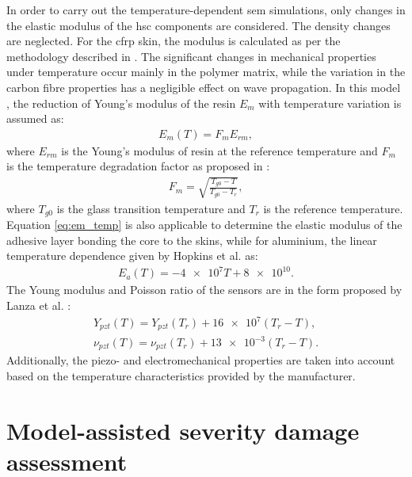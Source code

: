 \documentclass[11pt,a4paper,final]{report}
\begin{document}
In order to carry out the temperature-dependent \ac{sem} simulations, only changes in the elastic modulus of the \ac{hsc} components are considered.
The density changes are neglected. For the \ac{cfrp} skin, the modulus is calculated as per the methodology described in \cite{chamis1983simplified,salamone2009guided}.
The significant changes in mechanical properties under temperature occur mainly in the polymer matrix, while the variation in the carbon fibre properties has a negligible effect on wave propagation.
In this model \cite{salamone2009guided,hopkins2012extreme}, the reduction of Young’s modulus of the resin \(E_m\) with temperature variation is assumed as:
\begin{eqnarray}
	E_m(T)=F_m E_{rm},
	\label{eq:factor_temp}
\end{eqnarray}
where \(E_{rm}\) is the Young’s modulus of resin at the reference temperature and \(F_m\) is the temperature degradation factor as proposed in \cite{chamis1983simplified}:
\begin{eqnarray}
F_m=\sqrt{\frac{T_{g0}-T}{T_{g0}-T_r}},
\label{eq:em_temp}
\end{eqnarray}
where \(T_{g0}\) is the glass transition temperature and \(T_r\) is the reference temperature.
Equation \ref{eq:em_temp} is also applicable to determine the elastic modulus of the adhesive layer bonding the core to the skins, while for aluminium, the linear temperature dependence given by Hopkins et al. \cite{hopkins2012extreme} as:
\begin{eqnarray}
	E_a(T)=-\num{4e7}T+\num{8e10}.
	\label{eq:aluminium_temp}
\end{eqnarray}
The Young modulus and Poisson ratio of the sensors are in the form proposed by Lanza et al. \cite{lanza2008temperature}:
\begin{eqnarray}
	Y_{pzt}(T)=Y_{pzt}(T_r) + \num{16e7}(T_r-T),\\
	\nu_{pzt}(T)=\nu_{pzt}(T_r) + \num{13e-3}(T_r-T).
	\label{eq:pzt_temp}
\end{eqnarray}
Additionally, the piezo- and electromechanical properties are taken into account based on the temperature characteristics provided by the manufacturer.
 \section{Model-assisted severity damage assessment }
\label{sec:madif}
\end{document}
